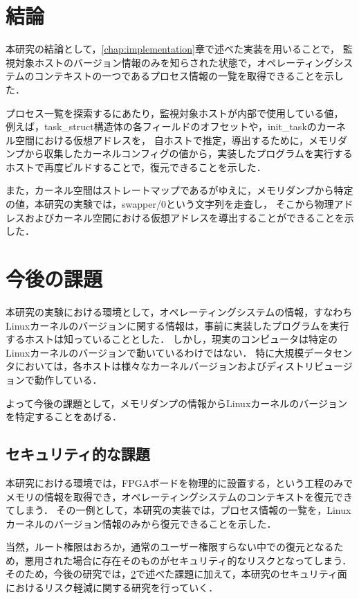 \section{結論}

本研究の結論として，\ref{chap:implementation}章で述べた実装を用いることで，
監視対象ホストのバージョン情報のみを知らされた状態で，オペレーティングシステムのコンテキストの一つであるプロセス情報の一覧を取得できることを示した．

プロセス一覧を探索するにあたり，監視対象ホストが内部で使用している値，
例えば，task\_struct構造体の各フィールドのオフセットや，init\_taskのカーネル空間における仮想アドレスを，
自ホストで推定，導出するために，メモリダンプから収集したカーネルコンフィグの値から，実装したプログラムを実行するホストで再度ビルドすることで，復元できることを示した．

また，カーネル空間はストレートマップであるがゆえに，メモリダンプから特定の値，本研究の実験では，swapper/0という文字列を走査し，
そこから物理アドレスおよびカーネル空間における仮想アドレスを導出することができることを示した．



\section{今後の課題}
\label{section:kongo}


本研究の実験における環境として，オペレーティングシステムの情報，すなわちLinuxカーネルのバージョンに関する情報は，事前に実装したプログラムを実行するホストは知っていることとした．
しかし，現実のコンピュータは特定のLinuxカーネルのバージョンで動いているわけではない．
特に大規模データセンタにおいては，各ホストは様々なカーネルバージョンおよびディストリビュージョンで動作している．

よって今後の課題として，メモリダンプの情報からLinuxカーネルのバージョンを特定することをあげる．

\subsection{セキュリティ的な課題}

本研究における環境では，FPGAボードを物理的に設置する，という工程のみでメモリの情報を取得でき，オペレーティングシステムのコンテキストを復元できてしまう．
その一例として，本研究の実装では，プロセス情報の一覧を，Linuxカーネルのバージョン情報のみから復元できることを示した．

当然，ルート権限はおろか，通常のユーザー権限すらない中での復元となるため，悪用された場合に存在そのものがセキュリティ的なリスクとなってしまう．
そのため，今後の研究では，\ref{section:kongo}で述べた課題に加えて，本研究のセキュリティ面におけるリスク軽減に関する研究を行っていく．
